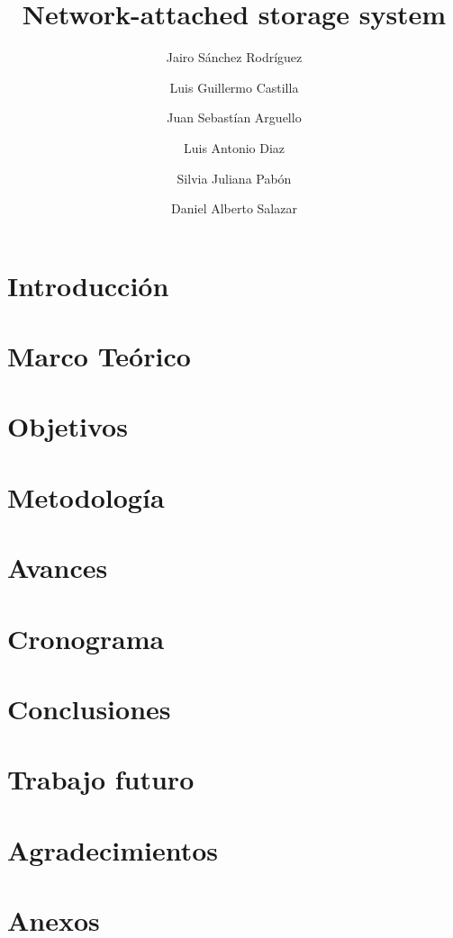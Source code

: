 \documentclass[runningheads]{llncs}
\begin{document}
%
\title{Network-attached storage system}
%
\author{Jairo Sánchez Rodríguez \and
Luis Guillermo Castilla\and
Juan Sebastían Arguello\and
Luis Antonio Diaz\and
Silvia Juliana Pabón\and
Daniel Alberto Salazar}
%
%
%
\maketitle              
%

%
\section{Introducción}

%
\section{Marco Teórico}

%
\section{Objetivos}

%
\section{Metodología}

%
\section{Avances}

%
\section{Cronograma}

%
\section{Conclusiones}

%
\section{Trabajo futuro}

%
\section{Agradecimientos}

%
\section{Anexos}

%
%


\end{document}
